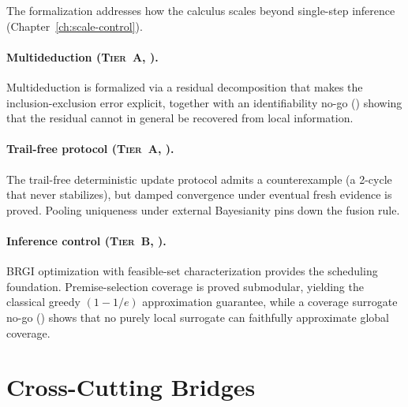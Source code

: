 The formalization addresses how the calculus scales beyond single-step
inference (Chapter~\ref{ch:scale-control}).

\paragraph{Multideduction (\textsc{Tier~A}, \claimConditional{}).}
Multideduction is formalized via a residual decomposition that makes
the inclusion-exclusion error explicit, together with an
identifiability no-go (\claimBoundary{}) showing that the residual
cannot in general be recovered from local information.

\paragraph{Trail-free protocol (\textsc{Tier~A}, \claimBoundary{}).}
The trail-free deterministic update protocol admits a counterexample
(a 2-cycle that never stabilizes), but damped convergence under
eventual fresh evidence is proved.  Pooling uniqueness under external
Bayesianity pins down the fusion rule.

\paragraph{Inference control (\textsc{Tier~B}, \claimConditional{}).}
BRGI optimization with feasible-set characterization provides the
scheduling foundation.  Premise-selection coverage is proved
submodular, yielding the classical greedy $(1 - 1/e)$ approximation
guarantee, while a coverage surrogate no-go (\claimBoundary{}) shows
that no purely local surrogate can faithfully approximate global
coverage.


\section{Cross-Cutting Bridges}
\label{sec:covers-bridges}


